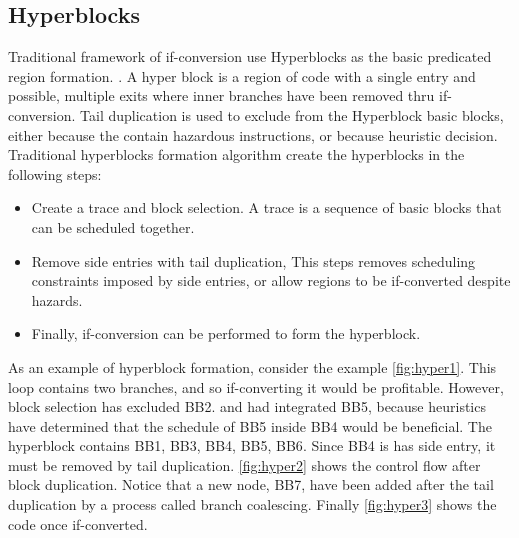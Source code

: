 \subsection{Hyperblocks}

Traditional framework of if-conversion use Hyperblocks as the basic predicated region formation. \cite{Mahlke:1992:ECS:144965.144998}. A hyper block is a region of code with a single entry and possible, multiple exits where inner branches have been removed thru if-conversion. Tail duplication is used to exclude from the Hyperblock basic blocks, either because the contain hazardous instructions, or because heuristic decision. 
Traditional hyperblocks formation algorithm create the hyperblocks in the following steps:
\begin{itemize}
\item Create a trace and block selection. A trace is a sequence of basic blocks that can be scheduled together. 
\item Remove side entries with tail duplication, This steps removes scheduling constraints imposed by side entries, or allow regions to be if-converted despite hazards.
\item Finally, if-conversion can be performed to form the hyperblock. 
\end{itemize}

As an example of hyperblock formation, consider the example \ref{fig:hyper1}. This loop contains two branches, and so if-converting it would be profitable. However, block selection has excluded BB2. and had integrated BB5, because heuristics have determined that the schedule of BB5 inside BB4 would be beneficial. The hyperblock contains {BB1, BB3, BB4, BB5, BB6}. Since BB4 is has side entry, it must be removed by tail duplication. \ref{fig:hyper2} shows the  control flow after block duplication. Notice that a new node, BB7, have been added after the tail duplication by a process called branch coalescing. Finally \ref{fig:hyper3} shows the code once if-converted.

